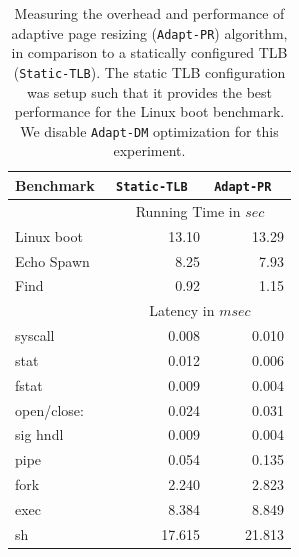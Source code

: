 \documentclass[10pt,twocolumn]{article}
\begin{document}
\begin{table}
\centering
      \begin{tabular}{|l| r r |} \hline
        Benchmark\verb, ,& {\tt Static-TLB} \verb, ,& {\tt Adapt-PR} \verb, , \\ \hline

     & \multicolumn{2}{c|}{Running Time in $sec$}\\ \cline {2-3}
Linux boot	&	13.10	&	13.29\\
Echo Spawn	&	8.25	&	7.93\\
Find	&	0.92	&	1.15\\
\cline{2-3}
     & \multicolumn{2}{c|}{Latency in $msec$}\\  \cline{2-3}
syscall	&	0.008	&	0.010\\
stat	 &	0.012	&	0.006\\
fstat	&	0.009	&	0.004\\
open/close:	&	0.024	&	0.031\\
sig hndl	&	0.009	&	0.004\\
pipe 	&	0.054	&	0.135\\
fork	&	2.240	&	2.823\\
exec	&	8.384	&	8.849\\
sh	&	17.615	&	21.813\\
 \hline
      \end{tabular}
\label{tab:adaptive_tlb_resizing}
\caption{Measuring the overhead and performance of adaptive page resizing ({\tt Adapt-PR}) algorithm, in comparison to
a statically configured TLB ({\tt Static-TLB}). The static TLB configuration was setup such that it provides the best performance for the Linux boot benchmark. We disable {\tt Adapt-DM} optimization for this experiment.}
\end{table} 
\end{document}
